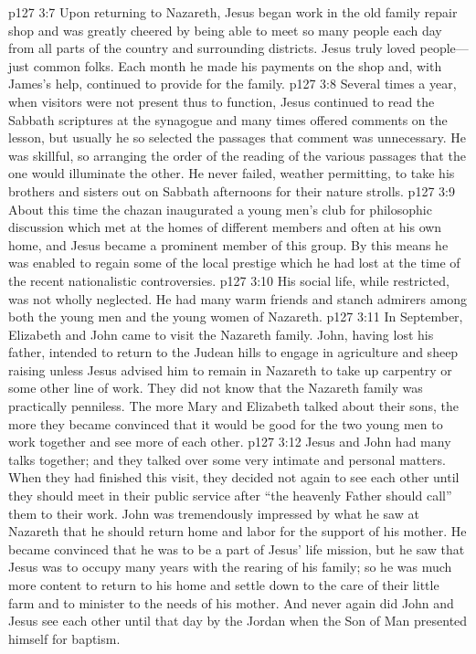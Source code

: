 \pc \vs p127 3:7 Upon returning to Nazareth, Jesus began work in the old family repair shop and was greatly cheered by being able to meet so many people each day from all parts of the country and surrounding districts. Jesus truly loved people---just common folks. Each month he made his payments on the shop and, with James’s help, continued to provide for the family.
\vs p127 3:8 Several times a year, when visitors were not present thus to function, Jesus continued to read the Sabbath scriptures at the synagogue and many times offered comments on the lesson, but usually he so selected the passages that comment was unnecessary. He was skillful, so arranging the order of the reading of the various passages that the one would illuminate the other. He never failed, weather permitting, to take his brothers and sisters out on Sabbath afternoons for their nature strolls.\plusone
\vs p127 3:9 About this time the chazan inaugurated a young men’s club for philosophic discussion which met at the homes of different members and often at his own home, and Jesus became a prominent member of this group. By this means he was enabled to regain some of the local prestige which he had lost at the time of the recent nationalistic controversies.
\vs p127 3:10 His social life, while restricted, was not wholly neglected. He had many warm friends and stanch admirers among both the young men and the young women of Nazareth.
\pc \vs p127 3:11 In September, Elizabeth and John came to visit the Nazareth family. John, having lost his father, intended to return to the Judean hills to engage in agriculture and sheep raising unless Jesus advised him to remain in Nazareth to take up carpentry or some other line of work. They did not know that the Nazareth family was practically penniless. The more Mary and Elizabeth talked about their sons, the more they became convinced that it would be good for the two young men to work together and see more of each other.
\vs p127 3:12 Jesus and John had many talks together; and they talked over some very intimate and personal matters. When they had finished this visit, they decided not again to see each other until they should meet in their public service after “the heavenly Father should call” them to their work. John was tremendously impressed by what he saw at Nazareth that he should return home and labor for the support of his mother. He became convinced that he was to be a part of Jesus’ life mission, but he saw that Jesus was to occupy many years with the rearing of his family; so he was much more content to return to his home and settle down to the care of their little farm and to minister to the needs of his mother. And never again did John and Jesus see each other until that day by the Jordan when the Son of Man presented himself for baptism.
